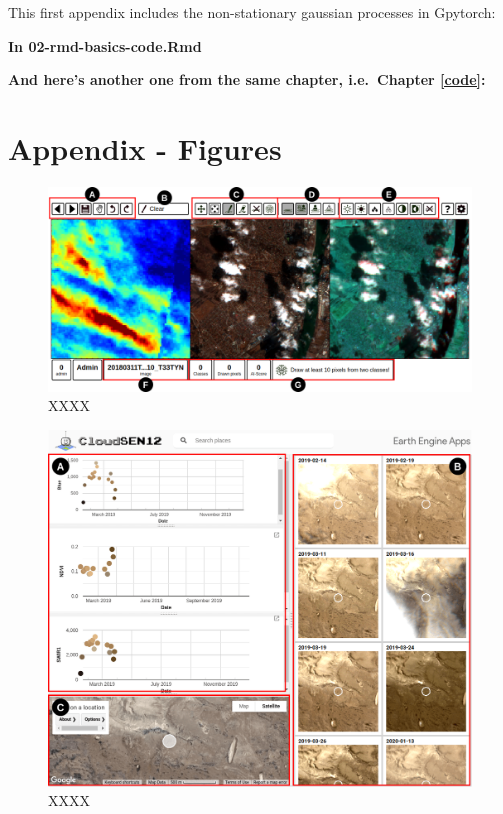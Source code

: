 \documentclass[a4paper, nobind]{templates/cdethesis}
\newcommand*{\bibtitle}{Bibliography}
\begin{document}
This first appendix includes the non-stationary gaussian processes in Gpytorch:

\textbf{In 02-rmd-basics-code.Rmd}

\textbf{And here's another one from the same chapter, i.e.~Chapter \ref{code}:}

\hypertarget{appendix---figures}{%
\chapter{Appendix - Figures}\label{appendix---figures}}

\setcounter{figure}{0}
\makeatletter 
\renewcommand{\thefigure}{S\@arabic\c@figure}
\makeatother

\begin{figure}[!h]
    \centering
    \includegraphics[width=1\linewidth]{figures/extra/figureS2.png}
    \caption{XXXX}
    \label{fig:figureS02}
\end{figure}

\begin{figure}[!h]
    \centering
    \includegraphics[width=1\linewidth]{figures/extra/figureS3.png}
    \caption{XXXX}
    \label{fig:figureS03}
\end{figure}


\setlength{\baselineskip}{0pt} %

{\renewcommand*\MakeUppercase[1]{#1}%
\printbibliography[heading=bibintoc,title={\bibtitle}]}
\end{document}
